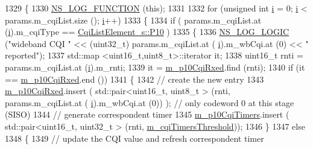 \begin{DoxyCode}
1329 \{
1330   \hyperlink{log-macros-disabled_8h_a90b90d5bad1f39cb1b64923ea94c0761}{NS\_LOG\_FUNCTION} (\textcolor{keyword}{this});
1331 
1332   \textcolor{keywordflow}{for} (\textcolor{keywordtype}{unsigned} \textcolor{keywordtype}{int} \hyperlink{bernuolliDistribution_8m_a6f6ccfcf58b31cb6412107d9d5281426}{i} = 0; \hyperlink{bernuolliDistribution_8m_a6f6ccfcf58b31cb6412107d9d5281426}{i} < params.m\_cqiList.size (); \hyperlink{bernuolliDistribution_8m_a6f6ccfcf58b31cb6412107d9d5281426}{i}++)
1333     \{
1334       \textcolor{keywordflow}{if} ( params.m\_cqiList.at (\hyperlink{bernuolliDistribution_8m_a6f6ccfcf58b31cb6412107d9d5281426}{i}).m\_cqiType == \hyperlink{structns3_1_1CqiListElement__s_a8f1bd827fd9842e7c07e39265d88299aa9db5a80433fbf06a4c98935e28ad26e8}{CqiListElement\_s::P10} )
1335         \{
1336           \hyperlink{group__logging_ga88acd260151caf2db9c0fc84997f45ce}{NS\_LOG\_LOGIC} (\textcolor{stringliteral}{"wideband CQI "} <<  (uint32\_t) params.m\_cqiList.at (
      \hyperlink{bernuolliDistribution_8m_a6f6ccfcf58b31cb6412107d9d5281426}{i}).m\_wbCqi.at (0) << \textcolor{stringliteral}{" reported"});
1337           std::map <uint16\_t,uint8\_t>::iterator it;
1338           uint16\_t rnti = params.m\_cqiList.at (\hyperlink{bernuolliDistribution_8m_a6f6ccfcf58b31cb6412107d9d5281426}{i}).m\_rnti;
1339           it = \hyperlink{classns3_1_1TtaFfMacScheduler_a0846e060ed4b553be784ddba3098eb81}{m\_p10CqiRxed}.find (rnti);
1340           \textcolor{keywordflow}{if} (it == \hyperlink{classns3_1_1TtaFfMacScheduler_a0846e060ed4b553be784ddba3098eb81}{m\_p10CqiRxed}.end ())
1341             \{
1342               \textcolor{comment}{// create the new entry}
1343               \hyperlink{classns3_1_1TtaFfMacScheduler_a0846e060ed4b553be784ddba3098eb81}{m\_p10CqiRxed}.insert ( std::pair<uint16\_t, uint8\_t > (rnti, params.m\_cqiList.at (
      \hyperlink{bernuolliDistribution_8m_a6f6ccfcf58b31cb6412107d9d5281426}{i}).m\_wbCqi.at (0)) ); \textcolor{comment}{// only codeword 0 at this stage (SISO)}
1344               \textcolor{comment}{// generate correspondent timer}
1345               \hyperlink{classns3_1_1TtaFfMacScheduler_a8b66a6a0a7a737e132a112c945ecefa9}{m\_p10CqiTimers}.insert ( std::pair<uint16\_t, uint32\_t > (rnti, 
      \hyperlink{classns3_1_1TtaFfMacScheduler_a3dd8aa322782db3d0f2bbaf9fede6fca}{m\_cqiTimersThreshold}));
1346             \}
1347           \textcolor{keywordflow}{else}
1348             \{
1349               \textcolor{comment}{// update the CQI value and refresh correspondent timer}

\end{DoxyCode}
